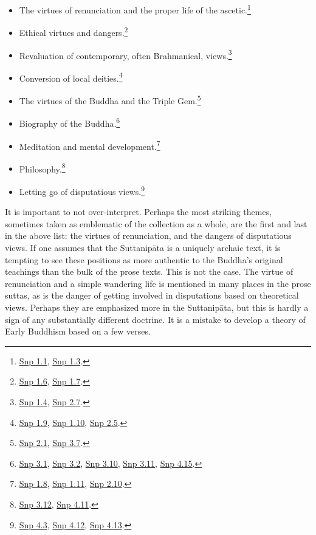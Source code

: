 \documentclass[12pt,openany]{book}%
\begin{document}
\begin{itemize}%
\item The virtues of renunciation and the proper life of the ascetic.\footnote{\href{https://suttacentral.net/snp1.1/en/sujato}{Snp 1.1}, \href{https://suttacentral.net/snp1.3/en/sujato}{Snp 1.3}. }%
\item Ethical virtues and dangers.\footnote{\href{https://suttacentral.net/snp1.6/en/sujato}{Snp 1.6}, \href{https://suttacentral.net/snp1.7/en/sujato}{Snp 1.7}. }%
\item Revaluation of contemporary, often Brahmanical, views.\footnote{\href{https://suttacentral.net/snp1.4/en/sujato}{Snp 1.4}, \href{https://suttacentral.net/snp2.7/en/sujato}{Snp 2.7}. }%
\item Conversion of local deities.\footnote{\href{https://suttacentral.net/snp1.9/en/sujato}{Snp 1.9}, \href{https://suttacentral.net/snp1.10/en/sujato}{Snp 1.10}, \href{https://suttacentral.net/snp2.5/en/sujato}{Snp 2.5}. }%
\item The virtues of the Buddha and the Triple Gem.\footnote{\href{https://suttacentral.net/snp2.1/en/sujato}{Snp 2.1}, \href{https://suttacentral.net/snp3.7/en/sujato}{Snp 3.7}. }%
\item Biography of the Buddha.\footnote{\href{https://suttacentral.net/snp3.1/en/sujato}{Snp 3.1}, \href{https://suttacentral.net/snp3.2/en/sujato}{Snp 3.2}, \href{https://suttacentral.net/snp3.10/en/sujato}{Snp 3.10}, \href{https://suttacentral.net/snp3.11/en/sujato}{Snp 3.11}, \href{https://suttacentral.net/snp4.15/en/sujato}{Snp 4.15}. }%
\item Meditation and mental development.\footnote{\href{https://suttacentral.net/snp1.8/en/sujato}{Snp 1.8}, \href{https://suttacentral.net/snp1.11/en/sujato}{Snp 1.11}, \href{https://suttacentral.net/snp2.10/en/sujato}{Snp 2.10}. }%
\item Philosophy.\footnote{\href{https://suttacentral.net/snp3.12/en/sujato}{Snp 3.12}, \href{https://suttacentral.net/snp4.11/en/sujato}{Snp 4.11}. }%
\item Letting go of disputatious views.\footnote{\href{https://suttacentral.net/snp4.3/en/sujato}{Snp 4.3}, \href{https://suttacentral.net/snp4.12/en/sujato}{Snp 4.12}, \href{https://suttacentral.net/snp4.13/en/sujato}{Snp 4.13}. }%
\end{itemize}

It is important to not over-interpret. Perhaps the most striking themes, sometimes taken as emblematic of the collection as a whole, are the first and last in the above list: the virtues of renunciation, and the dangers of disputatious views. If one assumes that the \textsanskrit{Suttanipāta} is a uniquely archaic text, it is tempting to see these positions as more authentic to the Buddha’s original teachings than the bulk of the prose texts. This is not the case. The virtue of renunciation and a simple wandering life is mentioned in many places in the prose suttas, as is the danger of getting involved in disputations based on theoretical views. Perhaps they are emphasized more in the \textsanskrit{Suttanipāta}, but this is hardly a sign of any substantially different doctrine. It is a mistake to develop a theory of Early Buddhism based on a few verses.
\end{document}
